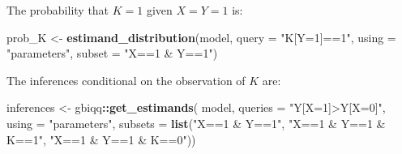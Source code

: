\documentclass[12pt,]{book}
\newenvironment{Shaded}{\begin{snugshade}}{\end{snugshade}}
\newcommand{\DataTypeTok}[1]{\textcolor[rgb]{0.13,0.29,0.53}{#1}}
\newcommand{\DecValTok}[1]{\textcolor[rgb]{0.00,0.00,0.81}{#1}}
\newcommand{\FloatTok}[1]{\textcolor[rgb]{0.00,0.00,0.81}{#1}}
\newcommand{\KeywordTok}[1]{\textcolor[rgb]{0.13,0.29,0.53}{\textbf{#1}}}
\newcommand{\NormalTok}[1]{#1}
\newcommand{\OperatorTok}[1]{\textcolor[rgb]{0.81,0.36,0.00}{\textbf{#1}}}
\newcommand{\StringTok}[1]{\textcolor[rgb]{0.31,0.60,0.02}{#1}}
\begin{document}
\begin{Shaded}
\end{Shaded}

The probability that \(K=1\) given \(X=Y=1\) is:

\begin{Shaded}
\begin{Highlighting}[]
\NormalTok{prob_K <-}\StringTok{ }\KeywordTok{estimand_distribution}\NormalTok{(model, }
                   \DataTypeTok{query =} \StringTok{"K[Y=1]==1"}\NormalTok{,}
                   \DataTypeTok{using =} \StringTok{"parameters"}\NormalTok{, }
                   \DataTypeTok{subset =} \StringTok{"X==1 & Y==1"}\NormalTok{)}
\end{Highlighting}
\end{Shaded}

The inferences conditional on the observation of \(K\) are:

\begin{Shaded}
\begin{Highlighting}[]
\NormalTok{inferences <-}\StringTok{ }\NormalTok{gbiqq}\OperatorTok{::}\KeywordTok{get_estimands}\NormalTok{(}
\NormalTok{                   model, }
                   \DataTypeTok{queries =} \StringTok{"Y[X=1]>Y[X=0]"}\NormalTok{,}
                   \DataTypeTok{using =} \StringTok{"parameters"}\NormalTok{, }
                   \DataTypeTok{subsets =} \KeywordTok{list}\NormalTok{(}\StringTok{"X==1 & Y==1"}\NormalTok{, }\StringTok{"X==1 & Y==1 & K==1"}\NormalTok{, }\StringTok{"X==1 & Y==1 & K==0"}\NormalTok{))}
\end{Highlighting}
\end{Shaded}
\end{document}
